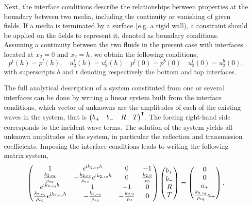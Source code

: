 Next, the interface conditions describe the relationships between properties at the boundary between two media, including the continuity or vanishing of given fields. If a media is terminated by a surface (e.g. a rigid wall), a constraint should be applied on the fields to represent it, denoted as boundary conditions. Assuming a continuity between the two fluids in the present case with interfaces located at $x_2 = 0$ and $x_2 = h$, we obtain the following conditions,
\begin{equation}
    p^t(h) = p^l(h), \quad u_{2}^t(h) = u_2^l(h) \quad p^l(0) = p^b(0) \quad u_{2}^l(0) = u_2^b(0),
\end{equation}
with superscripts $b$ and $t$ denoting respectively the bottom and top interfaces. 

The full analytical description of a system constituted from one or several interfaces can be done by writing a linear system built from the interface conditions, which vector of unknowns are the amplitudes of each of the existing waves in the system, that is $\begin{pmatrix} b_+ & b_- & R & T \end{pmatrix}^\mathsf T$. The forcing right-hand side corresponds to the incident wave terms. The solution of the system yields all unknown amplitudes of the system, in particular the reflection and transmission coefficients. Imposing the interface conditions leads to writing the following matrix system, 
\begin{equation}
    \begin{pmatrix}
        1 & e^{\mathrm i k_{2,eq}h}& 0 & -1 \\
        \frac{k_{2,eq}}{\rho_{eq}}& -\frac{k_{2,eq}}{\rho_{eq}} e^{\mathrm i k_{2,eq}h}&   0& \frac{k_{2,0}}{\rho_0} \\
        e^{\mathrm i k_{2,eq}h}& 1 & -1 & 0 \\
        \frac{k_{2,eq}}{\rho_{eq}} e^{\mathrm i k_{2,eq}h} &    -\frac{k_{2,eq}}{\rho_{eq}}& -\frac{k_{2,0}}{\rho_{0}}&  0 
    \end{pmatrix} \begin{pmatrix} b_+ \\ b_- \\ R \\ T \end{pmatrix} = \begin{pmatrix}
        0 \\ 0 \\ a_+ \\ \frac{k_{2,eq}}{\rho_{eq}} a_+
    \end{pmatrix}. 
    \label{eq:gm_pres_layer}
\end{equation}

